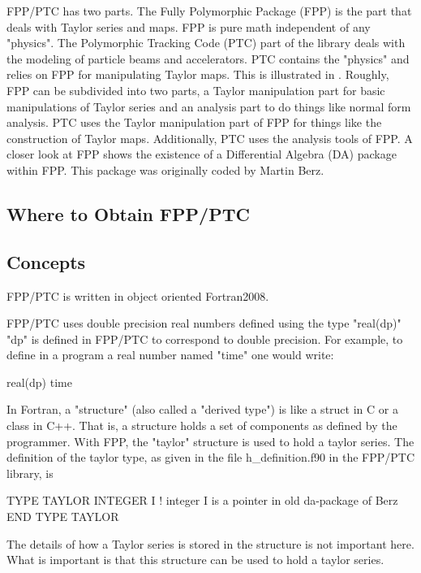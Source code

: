 \documentclass[english,12pt,article]{article} %
\begin{document}
FPP/PTC has two parts. The Fully Polymorphic Package (FPP) is the part that deals with Taylor series and maps. FPP is pure math independent of any "physics". The Polymorphic Tracking Code (PTC) part of the library deals with the modeling of particle beams and accelerators. PTC contains the "physics" and relies on FPP for manipulating Taylor maps. This is illustrated in . Roughly, FPP can be subdivided into two parts, a Taylor manipulation part for basic manipulations of Taylor series and an analysis part to do things like normal form analysis. PTC uses the Taylor manipulation part of FPP for things like the construction of Taylor maps. Additionally, PTC uses the analysis tools of FPP. A closer look at FPP shows the existence of a Differential Algebra (DA) package within FPP. This package was originally coded by Martin Berz.

\subsection{Where to Obtain FPP/PTC}

\subsection{Concepts}

FPP/PTC is written in object oriented Fortran2008. 

FPP/PTC uses double precision real numbers defined using the type "real(dp)" "dp" is defined in FPP/PTC to correspond to double precision. For example, to define in a program a real number named "time" one would write:
\begin{example}
  real(dp) time
\end{example}

In Fortran, a "structure" (also called a "derived type") is like a struct in C or a class in C++. That is, a structure holds a set of components as defined by the programmer. With FPP, the "taylor" structure is used to hold a taylor series. The definition of the taylor type, as given in the file h_definition.f90 in the FPP/PTC library, is
\begin{example1}
  TYPE TAYLOR
     INTEGER I       !  integer I is a pointer in old da-package of Berz
  END TYPE TAYLOR
\end{example1}
The details of how a Taylor series is stored in the structure is not important here. What is important is that this structure can be used to hold a taylor series.
\end{document}
